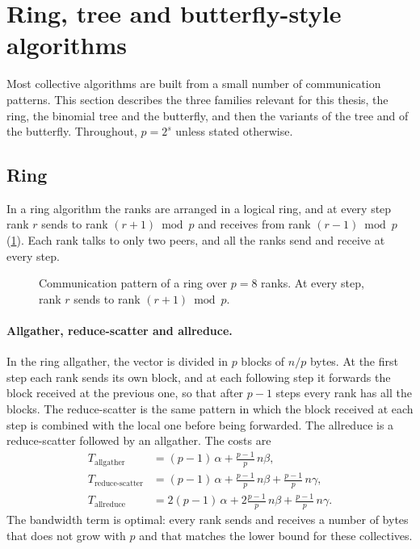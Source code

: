 \section{Ring, tree and butterfly-style algorithms}\label{sec:bg-algorithms}

Most collective algorithms are built from a small number of communication patterns.
This section describes the three families relevant for this thesis, the ring, the binomial tree and the butterfly, and then the \bine{} variants of the tree and of the butterfly.
Throughout, $p=2^s$ unless stated otherwise.

\subsection{Ring}\label{sec:bg-ring}

In a ring algorithm the ranks are arranged in a logical ring, and at every step rank $r$ sends to rank $(r+1)\bmod p$ and receives from rank $(r-1)\bmod p$ (\cref{fig:bg-ring}).
Each rank talks to only two peers, and all the ranks send and receive at every step.

\begin{figure}[H]
  \centering
  \caption{Communication pattern of a ring over $p=8$ ranks. At every step, rank $r$ sends to rank $(r+1)\bmod p$.}
  \label{fig:bg-ring}
\end{figure}

\paragraph{Allgather, reduce-scatter and allreduce.}
In the ring allgather, the vector is divided in $p$ blocks of $n/p$ bytes.
At the first step each rank sends its own block, and at each following step it forwards the block received at the previous one, so that after $p-1$ steps every rank has all the blocks.
The reduce-scatter is the same pattern in which the block received at each step is combined with the local one before being forwarded.
The allreduce is a reduce-scatter followed by an allgather.
The costs are
\begin{align}
  T_{\text{allgather}} &= (p-1)\,\alpha + \tfrac{p-1}{p}\,n\beta,\\
  T_{\text{reduce-scatter}} &= (p-1)\,\alpha + \tfrac{p-1}{p}\,n\beta + \tfrac{p-1}{p}\,n\gamma,\\
  T_{\text{allreduce}} &= 2(p-1)\,\alpha + 2\tfrac{p-1}{p}\,n\beta + \tfrac{p-1}{p}\,n\gamma.
\end{align}
The bandwidth term is optimal: every rank sends and receives a number of bytes that does not grow with $p$ and that matches the lower bound for these collectives.

